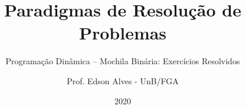 \title{Paradigmas de Resolução de Problemas}
\subtitle{Programação Dinâmica -- Mochila Binária: Exercícios Resolvidos}
\author{Prof. Edson Alves - UnB/FGA}
\date{2020}

